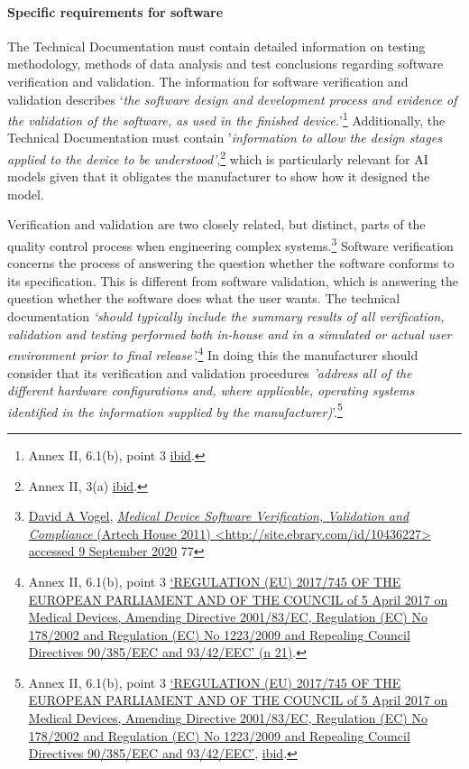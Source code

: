 \documentclass[
]{scrartcl}
\begin{document}
\hypertarget{specific-requirements-for-software}{%
\paragraph{Specific requirements for software}\label{specific-requirements-for-software}}

The Technical Documentation must contain detailed information on testing methodology, methods of data analysis and test conclusions regarding software verification and validation. The information for software verification and validation describes `\emph{the software design and development process and evidence of the validation of the software, as used in the finished device.}'\footnote{Annex II, 6.1(b), point 3 \protect\hyperlink{ref-REGULATIONEU2017a}{ibid}.} Additionally, the Technical Documentation must contain '\emph{information to allow the design stages applied to the device to be understood'},\footnote{Annex II, 3(a) \protect\hyperlink{ref-REGULATIONEU2017a}{ibid}.} which is particularly relevant for AI models given that it obligates the manufacturer to show how it designed the model.

Verification and validation are two closely related, but distinct, parts of the quality control process when engineering complex systems.\footnote{\protect\hyperlink{ref-vogelMedicalDeviceSoftware2011}{David A Vogel}, \protect\hyperlink{ref-vogelMedicalDeviceSoftware2011}{\emph{Medical Device Software Verification, Validation and Compliance} ({Artech House} 2011) \textless{}\url{http://site.ebrary.com/id/10436227}\textgreater{} accessed 9 September 2020} 77} Software verification concerns the process of answering the question whether the software conforms to its specification. This is different from software validation, which is answering the question whether the software does what the user wants. The technical documentation \emph{`should typically include the summary results of all verification, validation and testing performed both in-house and in a simulated or actual user environment prior to final release'.}\footnote{Annex II, 6.1(b), point 3 \protect\hyperlink{ref-REGULATIONEU2017a}{{`{REGULATION} ({EU}) 2017/745 {OF THE EUROPEAN PARLIAMENT AND OF THE COUNCIL} of 5 {April} 2017 on Medical Devices, Amending {Directive} 2001/83/{EC}, {Regulation} ({EC}) {No} 178/2002 and {Regulation} ({EC}) {No} 1223/2009 and Repealing {Council Directives} 90/385/{EEC} and 93/42/{EEC}'} (n 21)}.} In doing this the manufacturer should consider that its verification and validation procedures \emph{'address all of the different hardware configurations and, where applicable, operating systems identified in the information supplied by the manufacturer)}'.\footnote{Annex II, 6.1(b), point 3 \protect\hyperlink{ref-REGULATIONEU2017a}{{`{REGULATION} ({EU}) 2017/745 {OF THE EUROPEAN PARLIAMENT AND OF THE COUNCIL} of 5 {April} 2017 on Medical Devices, Amending {Directive} 2001/83/{EC}, {Regulation} ({EC}) {No} 178/2002 and {Regulation} ({EC}) {No} 1223/2009 and Repealing {Council Directives} 90/385/{EEC} and 93/42/{EEC}'}}, \protect\hyperlink{ref-REGULATIONEU2017a}{ibid}.}
\end{document}
